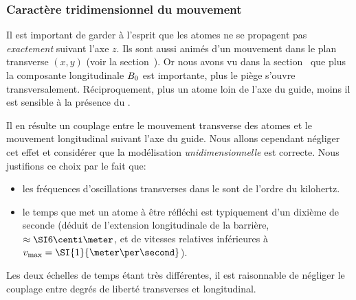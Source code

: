 \subsubsection{Caractère tridimensionnel du mouvement}{
Il est important de garder à l'esprit que les atomes ne se propagent pas \emph{exactement} suivant l'axe $z$. Ils sont aussi animés d'un mouvement dans le plan transverse $(x,y)$ (voir la section~). Or nous avons vu dans la section~ que plus la composante longitudinale ${B_0}$ est importante, plus le piège s'ouvre transversalement.
Réciproquement, plus un atome  loin de l'axe du guide, moins il est sensible à la présence du \mima. 

Il en résulte un couplage entre le mouvement transverse des atomes et le mouvement longitudinal suivant l'axe du guide.
Nous allons cependant négliger cet effet et considérer que la modélisation \emph{unidimensionnelle} est correcte.
Nous justifions ce choix par le fait que:
\begin{itemize}
	\item les fréquences d'oscillations transverses dans le \gm sont de l'ordre du kilohertz.
	\item le temps que met un atome à être réfléchi est typiquement d'un dixième de seconde (déduit de l'extension longitudinale de la barrière, $\approx \cm{6}$, et de vitesses relatives inférieures à $\vmax = \SI{1}{\meter\per\second}$).
\end{itemize} 
Les deux échelles de temps étant très différentes, il est raisonnable de négliger le couplage entre degrés de liberté transverses et longitudinal.
}


